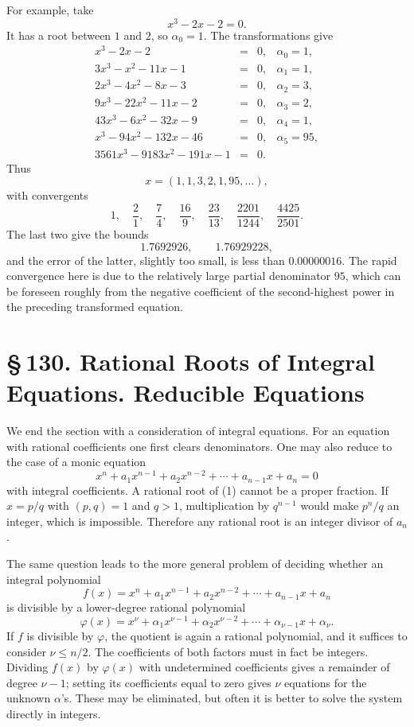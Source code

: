 \documentclass[11pt]{article}
\providecommand{\sect}[2]{\section*{\S\,#1. #2}}
\begin{document}
For example, take
\[
        x^3-2x-2=0.
\]
It has a root between $1$ and $2$, so $\alpha_0=1$. The transformations give
\[
\begin{array}{rcll}
x^3-2x-2&=&0,& \alpha_0=1,\\
3x^3-x^2-11x-1&=&0,& \alpha_1=1,\\
2x^3-4x^2-8x-3&=&0,& \alpha_2=3,\\
9x^3-22x^2-11x-2&=&0,& \alpha_3=2,\\
43x^3-6x^2-32x-9&=&0,& \alpha_4=1,\\
x^3-94x^2-132x-46&=&0,& \alpha_5=95,\\
3561x^3-9183x^2-191x-1&=&0.&
\end{array}
\]
Thus
\[
        x=(1,1,3,2,1,95,\ldots),
\]
with convergents
\[
        1,\quad \frac21,\quad \frac74,\quad \frac{16}{9},\quad
        \frac{23}{13},\quad \frac{2201}{1244},\quad \frac{4425}{2501}.
\]
The last two give the bounds
\[
        1.7692926,\qquad 1.76929228,
\]
and the error of the latter, slightly too small, is less than $0.00000016$. The rapid convergence here is due to the relatively large partial denominator $95$, which can be foreseen roughly from the negative coefficient of the second-highest power in the preceding transformed equation.

\sect{130}{Rational Roots of Integral Equations. Reducible Equations}

We end the section with a consideration of integral equations. For an equation with rational coefficients one first clears denominators. One may also reduce to the case of a monic equation
\[
\tag{1}        x^n+a_1x^{n-1}+a_2x^{n-2}+\cdots+a_{n-1}x+a_n=0
\]
with integral coefficients. A rational root of (1) cannot be a proper fraction. If $x=p/q$ with $(p,q)=1$ and $q>1$, multiplication by $q^{n-1}$ would make $p^n/q$ an integer, which is impossible. Therefore any rational root is an integer divisor of $a_n$.

The same question leads to the more general problem of deciding whether an integral polynomial
\[
        f(x)=x^n+a_1x^{n-1}+a_2x^{n-2}+\cdots+a_{n-1}x+a_n
\]
is divisible by a lower-degree rational polynomial
\[
        \varphi(x)=x^\nu+\alpha_1x^{\nu-1}+\alpha_2x^{\nu-2}+\cdots+\alpha_{\nu-1}x+\alpha_\nu.
\]
If $f$ is divisible by $\varphi$, the quotient is again a rational polynomial, and it suffices to consider $\nu\le n/2$. The coefficients of both factors must in fact be integers. Dividing $f(x)$ by $\varphi(x)$ with undetermined coefficients gives a remainder of degree $\nu-1$; setting its coefficients equal to zero gives $\nu$ equations for the unknown $\alpha$'s. These may be eliminated, but often it is better to solve the system directly in integers.
\end{document}
